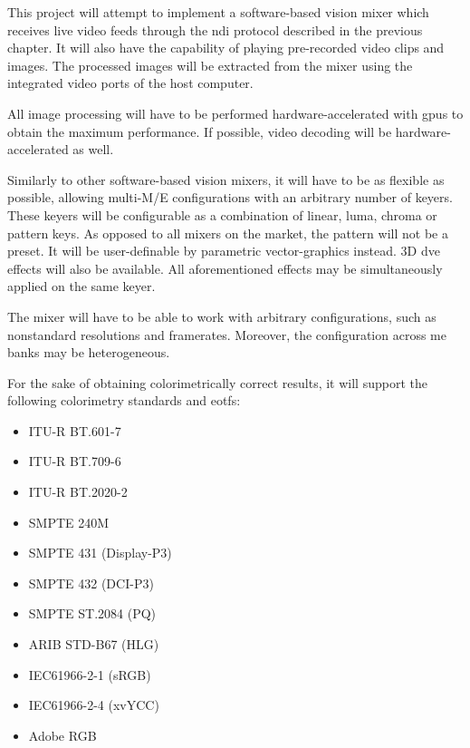 \documentclass[../main.tex]{subfiles}
\begin{document}
\label{chap:spec}

This project will attempt to implement a software-based vision mixer which receives live video feeds through the \gls{ndi} protocol described in the previous chapter. It will also have the capability of playing pre-recorded video clips and images. The processed images will be extracted from the mixer using the integrated video ports of the host computer.\newline

All image processing will have to be performed hardware-accelerated with \glspl{gpu} to obtain the maximum performance. If possible, video decoding will be hardware-accelerated as well.\newline

Similarly to other software-based vision mixers, it will have to be as flexible as possible, allowing multi-M/E configurations with an arbitrary number of keyers. These keyers will be configurable as a combination of linear, luma, chroma or pattern keys. As opposed to all mixers on the market, the pattern will not be a preset. It will be user-definable by parametric vector-graphics instead. 3D \gls{dve} effects will also be available. All aforementioned effects may be simultaneously applied on the same keyer.\newline



The mixer will have to be able to work with arbitrary configurations, such as nonstandard resolutions and framerates. Moreover, the configuration across \gls{me} banks may be heterogeneous.\newline

For the sake of obtaining colorimetrically correct results, it will support the following colorimetry standards and \glspl{eotf}:

\begin{itemize}
    \item ITU-R BT.601-7\cite{bt601}
    \item ITU-R BT.709-6\cite{bt709}
    \item ITU-R BT.2020-2\cite{bt2020}
    \item SMPTE 240M\cite{smpte240M}
    \item SMPTE 431 (Display-P3)\cite{smpte431}
    \item SMPTE 432 (DCI-P3)\cite{smpte432}
    \item SMPTE ST.2084 (PQ)\cite{smpte2084}
    \item ARIB STD-B67 (HLG)\cite{aribStdB67}
    \item IEC61966-2-1 (sRGB)\cite{iec61966-2-1}
    \item IEC61966-2-4 (xvYCC)\cite{iec61966-2-4}
    \item Adobe RGB
    
\end{itemize}
\end{document}
